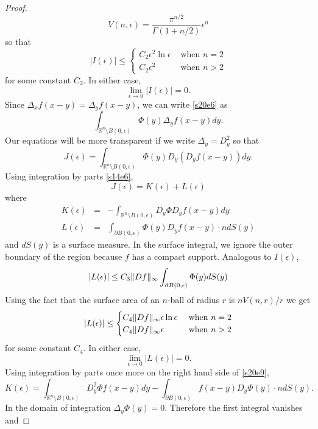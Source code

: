 \documentclass{article}
\DeclarePairedDelimiter\norm{\lVert}{\rVert}
\theoremstyle{plain}
\numberwithin{thm}{section}
\theoremstyle{plain}
\numberwithin{prop}{section}
\theoremstyle{definition}
\numberwithin{defn}{section}
\theoremstyle{remark}
\numberwithin{equation}{section}
\begin{document}
\begin{proof}
\[
V(n, \epsilon) = \frac{\pi^{n/2}}{\Gamma(1 + n/2)}\epsilon^n
\]
so that
\[
|I(\epsilon)| \le \begin{cases}
C_2\epsilon^2\ln\epsilon & \text{ when } n = 2 \\
C_2\epsilon^2 & \text{ when } n > 2
\end{cases}
\]
for some constant $C_2$. In either case, 
\begin{equation}\label{s20e7}
\lim_{\epsilon \rightarrow 0}|I(\epsilon)| = 0.
\end{equation}
Since $\Delta_x f(x - y) = \Delta_y f(x - y)$, we can write \eqref{s20e6} as
\[
\int_{\mathbb{R}^n \setminus B(0, \epsilon)}\Phi(y)\Delta_yf(x - y)dy.
\]
Our equations will be more transparent if we write $\Delta_y = D_y^2$ so that
\[
J(\epsilon) = \int_{\mathbb{R}^n \setminus B(0, \epsilon)}\Phi(y)D_y(D_yf(x - y))dy.
\]
Using integration by parts \eqref{s14e6},
\begin{equation}\label{s20e8}
J(\epsilon) =  K(\epsilon) + L(\epsilon)
\end{equation}
where
\begin{eqnarray}
K(\epsilon) &=& -\int_{\mathbb{R}^n \setminus B(0, \epsilon)} D_y\Phi D_yf(x-y) dy \label{s20e9} \\
L(\epsilon) &=& \int_{\partial B(0, \epsilon)} \Phi(y) D_y f(x - y) \cdot n dS(y) \label{s20e10}
\end{eqnarray}
and $dS(y)$ is a surface measure. In the surface integral, we ignore the outer boundary of the
region because $f$ has a compact support. Analogous to $I(\epsilon)$,
\[
|L(\epsilon)| \le C_3\norm{Df}_\infty \int_{\partial B(0, \epsilon)} \Phi(y) dS(y)
\]
Using the fact that the surface area of an $n$-ball of radius $r$ is $nV(n, r)/r$ we get
\[
|L(\epsilon)| \le \begin{cases}
C_4\norm{Df}_\infty \epsilon\ln\epsilon & \text{ when } n = 2 \\
C_4\norm{Df}_\infty \epsilon & \text{ when } n > 2
\end{cases}
\]
for some constant $C_4$. In either case,
\begin{equation}\label{s20e11}
\lim_{\epsilon \rightarrow 0}|L(\epsilon)| = 0.
\end{equation}
Using integration by parts once more on the right hand side of \eqref{s20e9},
\[
K(\epsilon) = \int_{\mathbb{R}^n \setminus B(0, \epsilon)} D^2_y\Phi f(x - y) dy -
\int_{\partial B(0, \epsilon)} f(x - y) D_y\Phi(y) \cdot n dS(y).
\] 
In the domain of integration $\Delta_y\Phi(y) = 0$. Therefore the first integral vanishes and

\end{proof}
\end{document}
